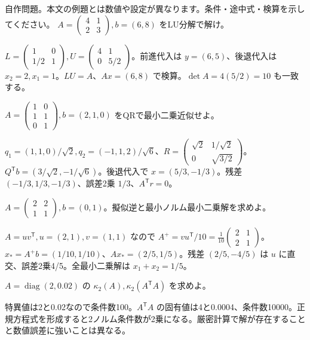 \documentclass[11pt]{article}
\begin{document}
自作問題。本文の例題とは数値や設定が異なります。条件・途中式・検算を示してください。
\problem[LUと連立式]
$A=\begin{pmatrix}4&1\\2&3\end{pmatrix},b=(6,8)$ をLU分解で解け。
\begin{ans}
$L=\begin{pmatrix}1&0\\1/2&1\end{pmatrix},U=\begin{pmatrix}4&1\\0&5/2\end{pmatrix}$。前進代入は $y=(6,5)$、後退代入は $x_2=2,x_1=1$。$LU=A$、$Ax=(6,8)$ で検算。$\det A=4(5/2)=10$ も一致する。
\end{ans}
\problem[QR最小二乗]
$A=\begin{pmatrix}1&0\\1&1\\0&1\end{pmatrix},b=(2,1,0)$ をQRで最小二乗近似せよ。
\begin{ans}
$q_1=(1,1,0)/\sqrt2,q_2=(-1,1,2)/\sqrt6$、$R=\begin{pmatrix}\sqrt2&1/\sqrt2\\0&\sqrt{3/2}\end{pmatrix}$。$Q^{\mathsf T}b=(3/\sqrt2,-1/\sqrt6)$。後退代入で $x=(5/3,-1/3)$。残差 $(-1/3,1/3,-1/3)$、誤差2乗 $1/3$、$A^{\mathsf T}r=0$。
\end{ans}
\newpage
\problem[階数1の擬似逆]
$A=\begin{pmatrix}2&2\\1&1\end{pmatrix},b=(0,1)$。擬似逆と最小ノルム最小二乗解を求めよ。
\begin{ans}
$A=uv^{\mathsf T},u=(2,1),v=(1,1)$ なので $A^+=vu^{\mathsf T}/10=\frac1{10}\begin{pmatrix}2&1\\2&1\end{pmatrix}$。$x_*=A^+b=(1/10,1/10)$、$Ax_*=(2/5,1/5)$。残差 $(2/5,-4/5)$ は $u$ に直交、誤差2乗4/5。全最小二乗解は $x_1+x_2=1/5$。
\end{ans}
\problem[条件数]
$A=\operatorname{diag}(2,0.02)$ の $\kappa_2(A),\kappa_2(A^{\mathsf T}A)$ を求めよ。
\begin{ans}
特異値は2と0.02なので条件数100。$A^{\mathsf T}A$ の固有値は4と0.0004、条件数10000。正規方程式を形成すると2ノルム条件数が2乗になる。厳密計算で解が存在することと数値誤差に強いことは異なる。
\end{ans}
\end{document}
